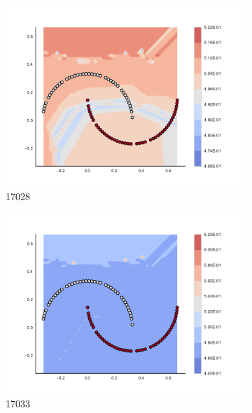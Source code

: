 \begin{figure}[h]
\begin{subfigure}[b]{0.09\textwidth}
    \includegraphics[clip, trim=2.35cm 1.75cm 4.5cm 0cm,width=\textwidth]{img/convergence/17028.pdf}
    \caption{17028}
    \label{fig:convergence_17028}
\end{subfigure}
%
\begin{subfigure}[b]{0.09\textwidth}
    \includegraphics[clip, trim=2.35cm 1.75cm 4.5cm 0cm,width=\textwidth]{img/convergence/17033.pdf}
    \caption{17033}
    \label{fig:convergence_17033}
\end{subfigure}
%
\begin{subfigure}[b]{0.09\textwidth}

\end{subfigure}
\end{figure}
